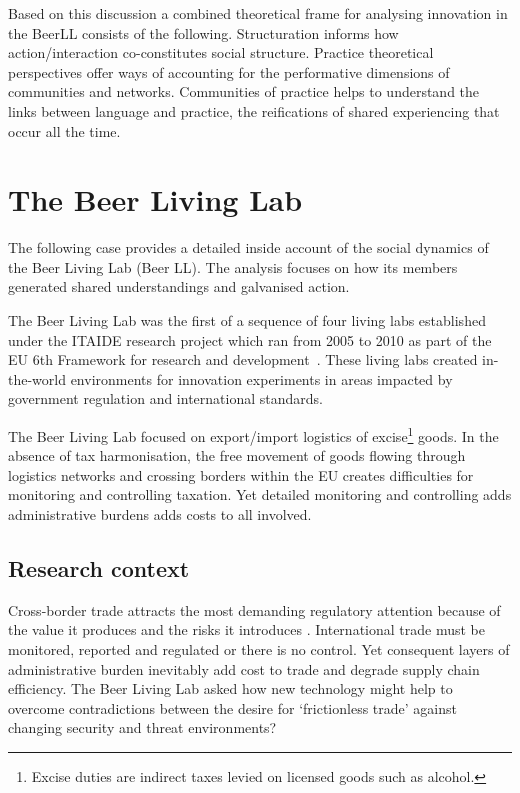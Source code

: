 \documentclass[graybox]{styles/svmult}
\begin{document}
Based on this discussion a combined theoretical frame for analysing innovation in the BeerLL consists of the following. Structuration informs how action/interaction co-constitutes social structure. Practice theoretical perspectives offer ways of accounting for the performative dimensions of communities and networks. Communities of practice helps to understand the links between language and practice, the reifications of shared experiencing that occur all the time. 

\section{The Beer Living Lab}\label{sec:BLL}
The following case provides a detailed inside account of the social dynamics of the Beer Living Lab (Beer LL).
The analysis focuses on how its members generated shared understandings and galvanised action.

The Beer Living Lab was the first of a sequence of four living labs established under the ITAIDE  research project which ran from 2005 to 2010 as part of the EU 6th Framework for research and development~\citep{tan2006ecustoms}. 
These living labs created in-the-world environments for innovation experiments in areas impacted by government regulation and international standards. 

The Beer Living Lab focused on export/import logistics of excise\footnote{Excise duties are indirect taxes levied on licensed goods such as alcohol.} goods.
In the absence of tax harmonisation, the free movement of goods flowing through logistics networks and crossing borders within the EU creates difficulties for monitoring and controlling taxation.
Yet detailed monitoring and controlling adds administrative burdens adds costs to all involved.



\subsection{Research context}
Cross-border trade attracts the most demanding regulatory attention because of the value it produces and the risks it introduces \citep{henriksen2008pacta}. 
International trade must be monitored, reported and regulated or there is no control.
Yet consequent layers of administrative burden inevitably add cost to trade and degrade supply chain efficiency. 
The Beer Living Lab asked how new technology might help to overcome contradictions between the desire for `frictionless trade' against changing security and threat environments?
\end{document}
